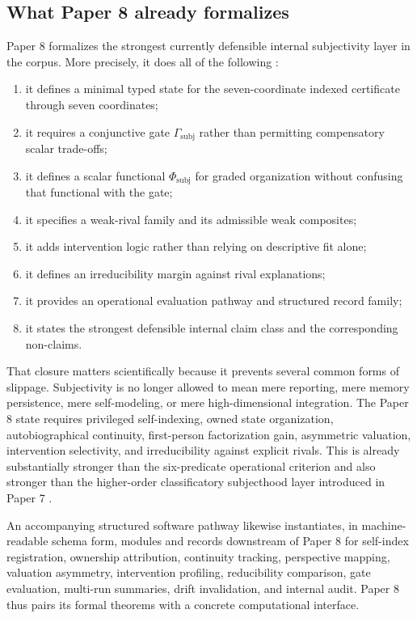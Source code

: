 \documentclass[11pt,a4paper]{article}
\theoremstyle{definition}
\newcommand{\PhiSubj}{\Phi_{\mathrm{subj}}}
\newcommand{\GateSubj}{\Gamma_{\mathrm{subj}}}
\begin{document}
\subsection{What Paper 8 already formalizes}
Paper 8 formalizes the strongest currently defensible internal subjectivity layer in the corpus. More precisely, it does all of the following \cite{paper8}:
\begin{enumerate}[leftmargin=1.5em]
\item it defines a minimal typed state for the seven-coordinate indexed certificate through seven coordinates;
\item it requires a conjunctive gate $\GateSubj$ rather than permitting compensatory scalar trade-offs;
\item it defines a scalar functional $\PhiSubj$ for graded organization without confusing that functional with the gate;
\item it specifies a weak-rival family and its admissible weak composites;
\item it adds intervention logic rather than relying on descriptive fit alone;
\item it defines an irreducibility margin against rival explanations;
\item it provides an operational evaluation pathway and structured record family;
\item it states the strongest defensible internal claim class and the corresponding non-claims.
\end{enumerate}

That closure matters scientifically because it prevents several common forms of slippage. Subjectivity is no longer allowed to mean mere reporting, mere memory persistence, mere self-modeling, or mere high-dimensional integration. The Paper 8 state requires privileged self-indexing, owned state organization, autobiographical continuity, first-person factorization gain, asymmetric valuation, intervention selectivity, and irreducibility against explicit rivals. This is already substantially stronger than the six-predicate operational criterion and also stronger than the higher-order classificatory subjecthood layer introduced in Paper 7 \cite{paper7}.

An accompanying structured software pathway likewise instantiates, in machine-readable schema form, modules and records downstream of Paper 8 for self-index registration, ownership attribution, continuity tracking, perspective mapping, valuation asymmetry, intervention profiling, reducibility comparison, gate evaluation, multi-run summaries, drift invalidation, and internal audit. Paper 8 thus pairs its formal theorems with a concrete computational interface.
\end{document}
